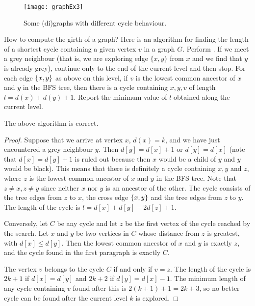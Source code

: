 \begin{figure}
\centering
\texttt{[image: graphEx3]}
\caption{Some (di)graphs with different cycle behaviour.}
\label{fig:cycle}
\end{figure}

How to compute the girth of a graph? Here is an algorithm for finding
the length of a shortest cycle containing a given vertex $v$ in a graph
$G$. Perform . If we meet a grey neighbour (that is,
we are exploring edge $\{x, y\}$ from $x$ and we find that $y$ is already
grey), continue only to the end of the current level and then stop. For
each edge $\mbox{$\{x, y\}$}$ as above on this level, if $v$ is the lowest
common ancestor of $x$ and $y$ in the BFS tree, then there is a cycle
containing $x, y, v$ of length $l=d(x) + d(y) + 1$. Report the minimum
value of $l$ obtained along the current level.

\begin{Theorem}
\label{thm:BFS-cycle} 
The above algorithm is correct.
\end{Theorem}

\begin{proof}
Suppose that we arrive at vertex $x$, $d(x) = k$, and we have just
encountered a grey neighbour $y$. Then $d[y] = d[x] + 1$ or $d[y] = d[x]$
(note that $d[x] = d[y] + 1$ is ruled out because then $x$ would be a
child of $y$ and $y$ would be black). This means that there is definitely
a cycle containing $x, y$ and $z$, where $z$ is the lowest common ancestor
of $x$ and $y$ in the BFS tree. Note that $z\neq x, z\neq y$ since neither
$x$ nor $y$ is an ancestor of the other. The cycle consists of the tree
edges from $z$ to $x$, the cross edge $\mbox{$\{x,y\}$}$ and the tree edges
from $z$ to $y$. The length of the cycle is $l=d[x] + d[y] - 2 d[z] + 1$.

Conversely, let $C$ be any cycle and let $z$ be the first vertex of
the cycle reached by the search. Let $x$ and $y$ be two vertices in $C$
whose distance  from $z$ is greatest, with $d[x] \leq d[y]$. Then the
lowest common ancestor of  $x$ and $y$ is exactly $z$, and the cycle
found in the first paragraph is exactly $C$.

The vertex $v$ belongs to the cycle $C$ if and only if $v = z$. The
length of the cycle is $2k+1$ if $d[x] = d[y]$ and $2k+2$ if $d[y] =
d[x] - 1$. The minimum length of any cycle containing $v$ found after
this is $2(k+1) + 1 = 2k+3$, so no better cycle can be found after the
current level $k$ is explored.
\end{proof}

